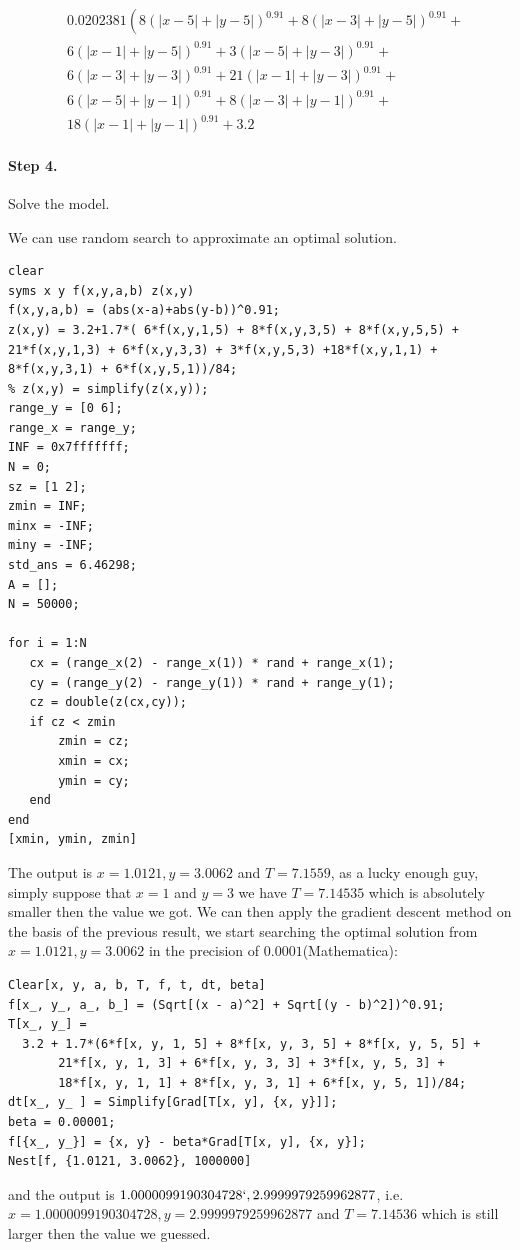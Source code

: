 \documentclass[11pt]{article}
\begin{document}
$$
\begin{aligned}
&0.0202381\left(8(|x-5|+|y-5|)^{0.91}+8(|x-3|+|y-5|)^{0.91}+\right. \\
&6(|x-1|+|y-5|)^{0.91}+3(|x-5|+|y-3|)^{0.91}+ \\
&6(|x-3|+|y-3|)^{0.91}+21(|x-1|+|y-3|)^{0.91}+ \\
&6(|x-5|+|y-1|)^{0.91}+8(|x-3|+|y-1|)^{0.91}+ \\
&18(|x-1|+|y-1|)^{0.91}+3.2
\end{aligned}
$$

\paragraph{Step 4.} Solve the model.

We can use random search to approximate an optimal solution.

\begin{lstlisting}
clear 
syms x y f(x,y,a,b) z(x,y)
f(x,y,a,b) = (abs(x-a)+abs(y-b))^0.91;
z(x,y) = 3.2+1.7*( 6*f(x,y,1,5) + 8*f(x,y,3,5) + 8*f(x,y,5,5) + 21*f(x,y,1,3) + 6*f(x,y,3,3) + 3*f(x,y,5,3) +18*f(x,y,1,1) + 8*f(x,y,3,1) + 6*f(x,y,5,1))/84;
% z(x,y) = simplify(z(x,y));
range_y = [0 6];
range_x = range_y;
INF = 0x7fffffff;
N = 0;
sz = [1 2];
zmin = INF;
minx = -INF;
miny = -INF;
std_ans = 6.46298;
A = [];
N = 50000;
   
for i = 1:N
   cx = (range_x(2) - range_x(1)) * rand + range_x(1);
   cy = (range_y(2) - range_y(1)) * rand + range_y(1);
   cz = double(z(cx,cy));
   if cz < zmin 
       zmin = cz;
       xmin = cx;
       ymin = cy;
   end      
end
[xmin, ymin, zmin]
\end{lstlisting}

The output is $x = 1.0121 , y =   3.0062 $ and $ T =   7.1559$, as a lucky enough guy, simply suppose that $ x = 1$ and $ y = 3$ we have $T = 7.14535$ which is absolutely smaller then the value we got.
We can then apply the gradient descent method on the basis of the previous result, we start searching the optimal solution from  $x = 1.0121 , y =   3.0062 $ in the precision of $0.0001$(Mathematica):

\begin{lstlisting}
Clear[x, y, a, b, T, f, t, dt, beta]
f[x_, y_, a_, b_] = (Sqrt[(x - a)^2] + Sqrt[(y - b)^2])^0.91;
T[x_, y_] = 
  3.2 + 1.7*(6*f[x, y, 1, 5] + 8*f[x, y, 3, 5] + 8*f[x, y, 5, 5] + 
       21*f[x, y, 1, 3] + 6*f[x, y, 3, 3] + 3*f[x, y, 5, 3] + 
       18*f[x, y, 1, 1] + 8*f[x, y, 3, 1] + 6*f[x, y, 5, 1])/84;
dt[x_, y_ ] = Simplify[Grad[T[x, y], {x, y}]];
beta = 0.00001;
f[{x_, y_}] = {x, y} - beta*Grad[T[x, y], {x, y}];
Nest[f, {1.0121, 3.0062}, 1000000]
\end{lstlisting}
 and the output is $1.0000099190304728`, 2.9999979259962877$, i.e. $x = 1.0000099190304728, y = 2.9999979259962877$ and $T = 7.14536$ which is still larger then the value we guessed.
 
\end{document}
